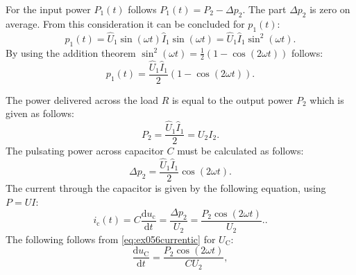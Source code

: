 \begin{solutionblock}
    For the input power $P_\mathrm{1}(t)$ follows $P_\mathrm{1}(t)= P_\mathrm{2} -\Delta p_\mathrm{2}$. The part $\Delta p_\mathrm{2}$ is zero on average. From this consideration it can be concluded for $p_\mathrm{1}(t)$:
    \begin{equation}
        p_\mathrm{1}(t) = \hat U_\mathrm{1} \sin(\omega t) \hat I_\mathrm{1} \sin(\omega t) = \hat U_\mathrm{1} \hat I_\mathrm{1} \sin^2(\omega t).
    \end{equation}
    By using the addition theorem $\sin^2(\omega t) = \frac{1}{2}(1-\cos(2\omega t))$ follows:
    \begin{equation}
        p_\mathrm{1}(t) = \frac{\hat U_\mathrm{1} \hat I_\mathrm{1}}{2}(1-\cos(2\omega t)).
    \end{equation}

    The power delivered across the load $R$ is equal to the output power $P_\mathrm{2}$ which is given as follows:
    \begin{equation}
        P_\mathrm{2} = \frac{\hat U_\mathrm{1}\hat I_\mathrm{1}}{2} = U_\mathrm{2} I_\mathrm{2}.
    \end{equation}
    The pulsating power across capacitor $C$ must be calculated as follows:
    \begin{equation}
        \Delta p_\mathrm{2} = \frac{\hat U_\mathrm{1}\hat I_\mathrm{1}}{2} \cos(2\omega t).
    \end{equation}
    The current through the capacitor is given by the following equation, using $P = UI$:
    \begin{equation}
        i_\mathrm{c}(t)=C \frac{\mathrm{d}u_\mathrm{c}}{\mathrm{d}t} = \frac{\Delta p_\mathrm{2}}{U_\mathrm{2}} = \frac{P_\mathrm{2}\cos(2\omega t)}{U_\mathrm{2}}.\label{eq:ex056currentic}.
    \end{equation}
    The following follows from \eqref{eq:ex056currentic} for $U_\mathrm{C}$:
    \begin{equation}
        \frac{\mathrm{d}u_\mathrm{C}}{\mathrm{d}t} = \frac{P_\mathrm{2}\cos (2\omega t)}{C U_\mathrm{2}},
    \end{equation}


\end{solutionblock}
